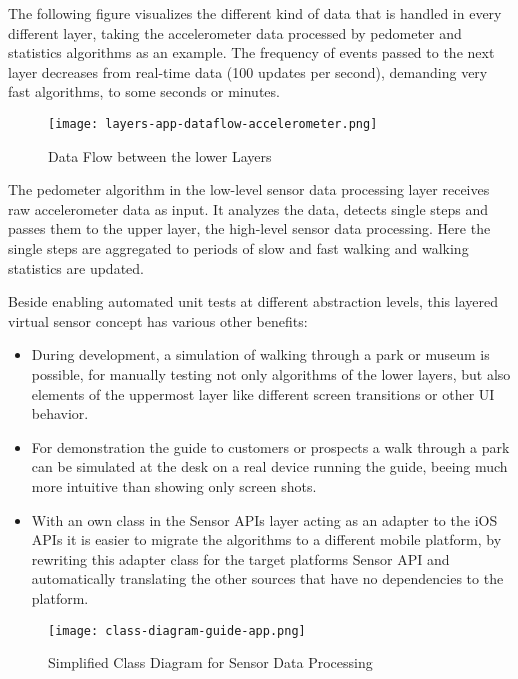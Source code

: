 The following figure visualizes the different kind of data that is handled in every different layer, taking the accelerometer data processed by pedometer and statistics algorithms as an example. The frequency of events passed to the next layer decreases from real-time data (100 updates per second), demanding very fast algorithms, to some seconds or minutes.

\begin{figure}[H]
\centering
\texttt{[image: layers-app-dataflow-accelerometer.png]}
\caption{Data Flow between the lower Layers}
\end{figure}

The pedometer algorithm in the low-level sensor data processing layer receives raw accelerometer data as input. It analyzes the data, detects single steps and passes them to the upper layer, the high-level sensor data processing. Here the single steps are aggregated to periods of slow and fast walking and walking statistics are updated.

Beside enabling automated unit tests at different abstraction levels, this layered virtual sensor concept has various other benefits:

\begin{itemize}
\item During development, a simulation of walking through a park or museum is possible, for manually testing not only algorithms of the lower layers, but also elements of the uppermost layer like different screen transitions or other UI behavior.
\item For demonstration the guide to customers or prospects a walk through a park can be simulated at the desk on a real device running the guide, beeing much more intuitive than showing only screen shots.
\item With an own class in the Sensor APIs layer acting as an adapter to the iOS APIs it is easier to migrate the algorithms to a different mobile platform, by rewriting this adapter class for the target platforms Sensor API and automatically translating the other sources that have no dependencies to the platform.
\end{itemize}



\begin{figure}[H]
\centering
\texttt{[image: class-diagram-guide-app.png]}
\caption{Simplified Class Diagram for Sensor Data Processing}
\end{figure}

